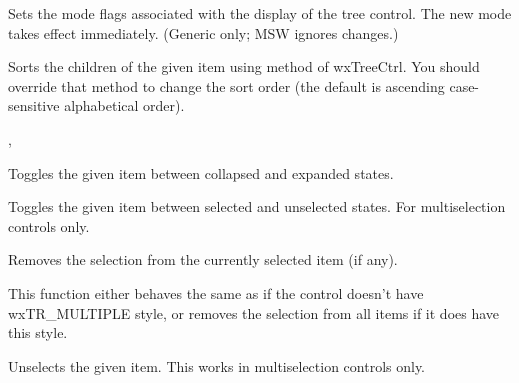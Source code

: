 Sets the mode flags associated with the display of the tree control.
The new mode takes effect immediately.
(Generic only; MSW ignores changes.)


\label{wxtreectrlsortchildren}


Sorts the children of the given item using
 method of wxTreeCtrl. You
should override that method to change the sort order (the default is ascending
case-sensitive alphabetical order).


, 


\label{wxtreectrltoggle}


Toggles the given item between collapsed and expanded states.


\label{wxtreectrltoggleitemselection}


Toggles the given item between selected and unselected states. For
multiselection controls only.


\label{wxtreectrlunselect}


Removes the selection from the currently selected item (if any).


\label{wxtreectrlunselectall}


This function either behaves the same as 
if the control doesn't have wxTR\_MULTIPLE style, or removes the selection from
all items if it does have this style.


\label{wxtreectrlunselectitem}


Unselects the given item. This works in multiselection controls only.


